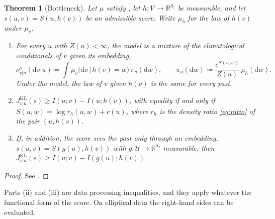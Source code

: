 \documentclass[11pt]{article}
\theoremstyle{plain}
\newtheorem{theorem}{Theorem}[section]
\theoremstyle{definition}
\theoremstyle{remark}
\newcommand{\RR}{\mathbb{R}}
\newcommand{\UU}{\mathcal{U}}
\newcommand{\VV}{\mathcal{V}}
\newcommand{\Dd}{\mathrm{d}}
\newcommand{\define}{\coloneqq}
\newcommand{\Jvu}{J_{v\vert u}}
\begin{document}
\begin{theorem}[Bottleneck]
 \label{thm:bottleneck}
 Let $\mu$ satisfy , let $h:\VV\to\RR^{d_z}$ be measurable,
 and let $s(u,v)=S(u,h(v))$ be an admissible score. Write $\mu_h$ for the
 law of $h(v)$ under $\mu_v$.
 \begin{enumerate}[label=(\roman*)]
  \item For every $u$ with $Z(u)<\infty$, the model is a mixture of the
        climatological conditionals of $v$ given its embedding,
        \begin{equation*}
         \nu^{s}_{v\vert u}(\Dd v\vert u)=\int\mu_v\bigl(\Dd v\,\big\vert\,h(v)=w\bigr)\,\pi_u(\Dd w),
         \qquad\pi_u(\Dd w)\define\frac{e^{S(u,w)}}{Z(u)}\,\mu_h(\Dd w).
        \end{equation*}
        Under the model, the law of $v$ given $h(v)$ is the same for every
        past.
  \item $\Jvu^{\mathrm{KL}}(s)\ge I(u;v)-I(u;h(v))$, with equality if and only if
        $S(u,w)=\log r_h(u,w)+c(u)$, where $r_h$ is the density ratio
        \eqref{eq:ratio} of the pair $(u,h(v))$.
  \item If, in addition, the score sees the past only through an embedding,
        $s(u,v)=S(g(u),h(v))$ with $g:\UU\to\RR^{d_z}$ measurable, then
        $\Jvu^{\mathrm{KL}}(s)\ge I(u;v)-I(g(u);h(v))$.
 \end{enumerate}
\end{theorem}
\begin{proof}
 See .
\end{proof}

Parts (ii) and (iii) are data processing inequalities, and they apply
whatever the functional form of the score. On elliptical data the right-hand
sides can be evaluated.
\end{document}
